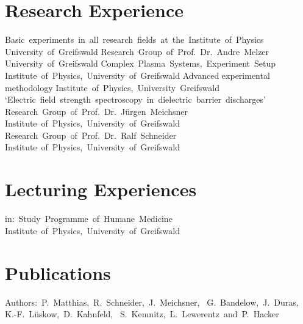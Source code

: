 \documentclass[11pt,a4paper]{moderncv}
\begin{document}
	\newpage
	\section{Research Experience}
					{Basic~experiments~in~all~research~fields~at~the~Institute~of~Physics\newline}{}%
					{University~of~Greifswald}{}
					{Research~Group~of~Prof.~Dr.~Andre~Melzer\newline}{}%
					{University~of~Greifswald}{}
					{Complex~Plasma~Systems,~Experiment~Setup\newline}{}%
					{Institute~of~Physics,~University~of~Greifswald}{}
					{Advanced experimental methodology\newline}{}%
					{Institute~of~Physics,~University~Greifswald}{}
					{`Electric~field~strength~spectroscopy~in~dielectric~barrier~discharges'\newline}{}%
					{Research~Group~of~Prof.~Dr.~Jürgen~Meichsner\newline}%
					{Institute~of~Physics,~University~of~Greifswald}
					{Research~Group~of~Prof.~Dr.~Ralf~Schneider\newline}{}%
					{Institute~of~Physics,~University~of~Greifswald}{}
	
	\section{Lecturing Experiences}
											{in:~Study~Programme~of~Humane~Medicine\newline}{}%
											{Institute~of~Physics,~University~of~Greifswald}{}
	
	\section{Publications}
        										{Authors:~P.~Matthias,~R.~Schneider,~J.~Meichsner,~%
														 G.~Bandelow,~J.~Duras,\newline%
														 K.-F.~Lüskow,~D.~Kahnfeld,~%
													   S.~Kemnitz,~L.~Lewerentz~and~P.~Hacker}{}{}{}
	\newpage	
\end{document}
